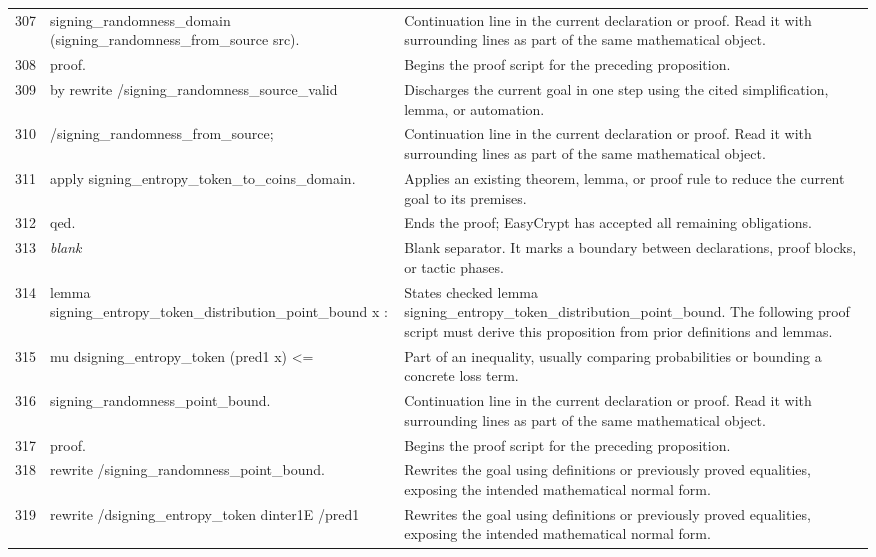 \documentclass[10pt]{article}
\begin{document}
\begin{longtable}{r L{0.53\textwidth} L{0.37\textwidth}}
307 & {\ttfamily\scriptsize   signing\_randomness\_domain (signing\_randomness\_from\_source src).} & Continuation line in the current declaration or proof.  Read it with surrounding lines as part of the same mathematical object. \\
308 & {\ttfamily\scriptsize proof.} & Begins the proof script for the preceding proposition. \\
309 & {\ttfamily\scriptsize by rewrite /signing\_randomness\_source\_valid} & Discharges the current goal in one step using the cited simplification, lemma, or automation. \\
310 & {\ttfamily\scriptsize            /signing\_randomness\_from\_source;} & Continuation line in the current declaration or proof.  Read it with surrounding lines as part of the same mathematical object. \\
311 & {\ttfamily\scriptsize    apply signing\_entropy\_token\_to\_coins\_domain.} & Applies an existing theorem, lemma, or proof rule to reduce the current goal to its premises. \\
312 & {\ttfamily\scriptsize qed.} & Ends the proof; EasyCrypt has accepted all remaining obligations. \\
313 & {\ttfamily\scriptsize \emph{blank}} & Blank separator.  It marks a boundary between declarations, proof blocks, or tactic phases. \\
314 & {\ttfamily\scriptsize lemma signing\_entropy\_token\_distribution\_point\_bound x :} & States checked lemma signing\_entropy\_token\_distribution\_point\_bound.  The following proof script must derive this proposition from prior definitions and lemmas. \\
315 & {\ttfamily\scriptsize   mu dsigning\_entropy\_token (pred1 x) <=} & Part of an inequality, usually comparing probabilities or bounding a concrete loss term. \\
316 & {\ttfamily\scriptsize   signing\_randomness\_point\_bound.} & Continuation line in the current declaration or proof.  Read it with surrounding lines as part of the same mathematical object. \\
317 & {\ttfamily\scriptsize proof.} & Begins the proof script for the preceding proposition. \\
318 & {\ttfamily\scriptsize rewrite /signing\_randomness\_point\_bound.} & Rewrites the goal using definitions or previously proved equalities, exposing the intended mathematical normal form. \\
319 & {\ttfamily\scriptsize rewrite /dsigning\_entropy\_token dinter1E /pred1} & Rewrites the goal using definitions or previously proved equalities, exposing the intended mathematical normal form. \\

\end{longtable}
\end{document}

